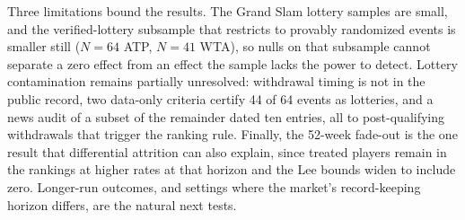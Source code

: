 Three limitations bound the results. The Grand Slam lottery samples are small, and the verified-lottery subsample that restricts to provably randomized events is smaller still ($N = 64$ ATP, $N = 41$ WTA), so nulls on that subsample cannot separate a zero effect from an effect the sample lacks the power to detect. Lottery contamination remains partially unresolved: withdrawal timing is not in the public record, two data-only criteria certify 44 of 64 events as lotteries, and a news audit of a subset of the remainder dated ten entries, all to post-qualifying withdrawals that trigger the ranking rule. Finally, the 52-week fade-out is the one result that differential attrition can also explain, since treated players remain in the rankings at higher rates at that horizon and the Lee bounds widen to include zero. Longer-run outcomes, and settings where the market's record-keeping horizon differs, are the natural next tests.
